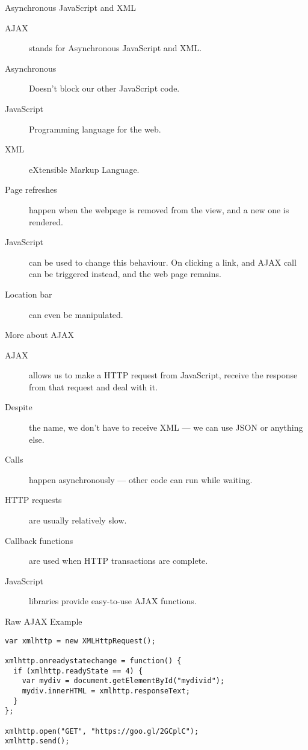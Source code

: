 \begin{frame}{Asynchronous JavaScript and XML}
  
  \begin{description}
    \item[AJAX] stands for Asynchronous JavaScript and XML.
    \item[Asynchronous] Doesn't block our other JavaScript code.
    \item[JavaScript] Programming language for the web.
    \item[XML] eXtensible Markup Language.
    \item[Page refreshes] happen when the webpage is removed from the view, and a new one is rendered.
    \item[JavaScript] can be used to change this behaviour. On clicking a link, and AJAX call can be triggered instead, and the web page remains.
    \item[Location bar] can even be manipulated.
  \end{description}
\end{frame}


\begin{frame}{More about AJAX}
  \begin{description}
    \item[AJAX] allows us to make a HTTP request from JavaScript, receive the response from that request and deal with it.
    \item[Despite] the name, we don't have to receive XML --- we can use JSON or anything else.
    \item[Calls] happen asynchronously --- other code can run while waiting.
    \item[HTTP requests] are usually relatively slow.
    \item[Callback functions] are used when HTTP transactions are complete.
    \item[JavaScript] libraries provide easy-to-use AJAX functions.
  \end{description}
\end{frame}


\begin{frame}[fragile]{Raw AJAX Example}
  \begin{verbatim}
var xmlhttp = new XMLHttpRequest();

xmlhttp.onreadystatechange = function() {
  if (xmlhttp.readyState == 4) {
    var mydiv = document.getElementById("mydivid");
    mydiv.innerHTML = xmlhttp.responseText;
  }
};

xmlhttp.open("GET", "https://goo.gl/2GCplC");
xmlhttp.send();
  \end{verbatim}
\end{frame}


